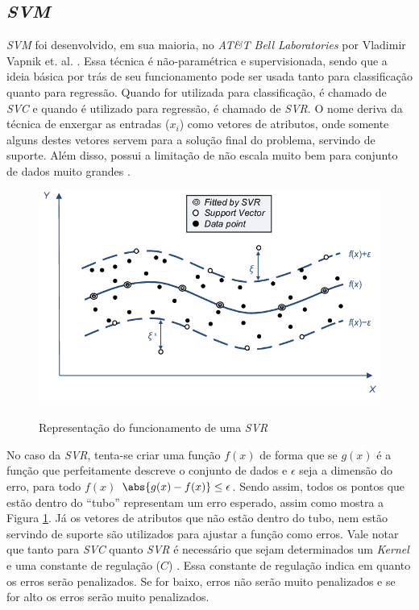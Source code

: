 \subsection{\textit{\acrfull{SVM}}}

\textit{\acrshort{SVM}} foi desenvolvido, em sua maioria, no \textit{AT\&T Bell Laboratories} por Vladimir Vapnik et. al. \cite{Smola03atutorial}. Essa técnica é não-paramétrica e supervisionada, sendo que a ideia básica por trás de seu funcionamento pode ser usada tanto para classificação quanto para regressão. Quando for utilizada para classificação, é chamado de \textit{\acrfull{SVC}} e quando é utilizado para regressão, é chamado de \textit{\acrfull{SVR}}. O nome deriva da técnica de enxergar as entradas (\(x_i\)) como vetores de atributos, onde somente alguns destes vetores servem para a solução final do problema, servindo de suporte. Além disso, possui a limitação de não escala muito bem para conjunto de dados muito grandes \cite{chollet2018deep}. 

\begin{figure}[htbp]
    \centering
    \includegraphics[scale=0.6]{monography/img/models/svr_example.png}
    \label{figure:support_vector_machine}
    \caption[Representação do funcionamento de uma \textit{\acrshort{SVM}}]{Representação do funcionamento de uma \textit{\acrshort{SVR}}\footnotemark}
\end{figure}


No caso da \textit{\acrshort{SVR}}, tenta-se criar uma função \(f(x)\) de forma que se \(g(x)\) é a função que perfeitamente descreve o conjunto de dados e \(\epsilon\) seja a dimensão do erro, para todo \(f(x)\) \(\abs{g(x) - f(x)} \leq \epsilon \). Sendo assim, todos os pontos que estão dentro do ``tubo'' representam um erro esperado, assim como mostra a Figura \ref{figure:support_vector_machine}. Já os vetores de atributos que não estão dentro do tubo, nem estão servindo de suporte são utilizados para ajustar a função como erros. Vale notar que tanto para \textit{\acrshort{SVC}} quanto \textit{\acrshort{SVR}} é necessário que sejam determinados um \textit{Kernel} e uma constante de regulação (\(C\)) \cite{murphy2012machine}. Essa constante de regulação indica em quanto os erros serão penalizados. Se for baixo, erros não serão muito penalizados e se for alto os erros serão muito penalizados.

